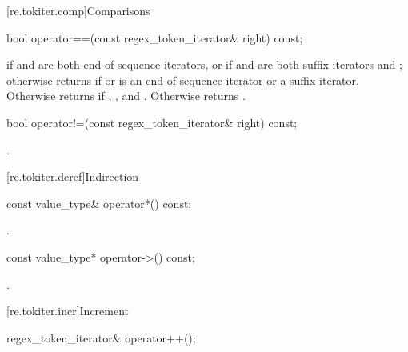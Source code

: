 [re.tokiter.comp]{Comparisons}

%
\begin{itemdecl}
bool operator==(const regex_token_iterator& right) const;
\end{itemdecl}

\begin{itemdescr}
\pnum
\returns {} if  and  are both end-of-sequence iterators,
or if  and  are both suffix iterators and ;
otherwise returns  if  or  is an end-of-sequence
iterator or a suffix iterator. Otherwise returns  if ,
, and . Otherwise returns .
\end{itemdescr}

%
\begin{itemdecl}
bool operator!=(const regex_token_iterator& right) const;
\end{itemdecl}

\begin{itemdescr}
\pnum\returns {}.
\end{itemdescr}

[re.tokiter.deref]{Indirection}

%
\begin{itemdecl}
const value_type& operator*() const;
\end{itemdecl}

\begin{itemdescr}
\pnum\returns {}.
\end{itemdescr}


%
\begin{itemdecl}
const value_type* operator->() const;
\end{itemdecl}

\begin{itemdescr}
\pnum\returns {}.
\end{itemdescr}


[re.tokiter.incr]{Increment}

%
\begin{itemdecl}
regex_token_iterator& operator++();
\end{itemdecl}


